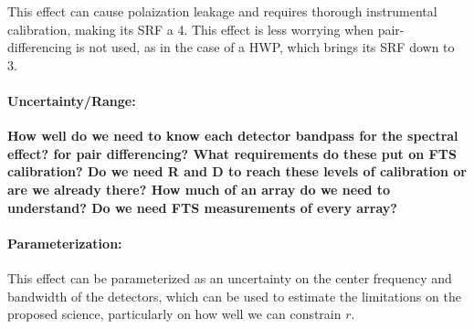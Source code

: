 This effect can cause polaization leakage and requires thorough instrumental calibration, making its SRF a 4. This effect is less worrying when pair-differencing is not used, as in the case of a HWP, which brings its SRF down to 3.

\paragraph{Uncertainty/Range:}
\textbf{How well do we need to know each detector bandpass for the spectral effect? for pair differencing? What requirements do these put on FTS calibration? Do we need R and D to reach these levels of calibration or are we already there? How much of an array do we need to understand? Do we need FTS measurements of every array?}

\paragraph{Parameterization:}
This effect can be parameterized as an uncertainty on the center frequency and bandwidth of the detectors, which can be used to estimate the limitations on the proposed science, particularly on how well we can constrain $r$.
